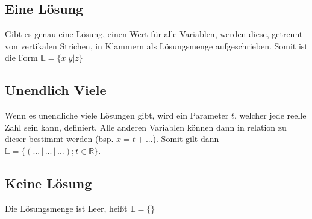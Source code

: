 \documentclass{article}
\begin{document}
\subsection{Eine Lösung}
Gibt es genau eine Lösung, einen Wert für alle Variablen, werden diese, getrennt von vertikalen Strichen, in Klammern als Lösungsmenge aufgeschrieben. Somit ist die Form $\mathbb{L} = \{x \vert y \vert z\}$
 
\subsection{Unendlich Viele}  
Wenn es unendliche viele Lösungen gibt, wird ein Parameter $t$, welcher jede reelle Zahl sein kann, definiert. Alle anderen Variablen können dann in relation zu dieser bestimmt werden (bsp. $x = t + ...$).
Somit gilt dann $\mathbb{L} = \{(... \,\vert\, ... \,\vert\, ...); t \in \mathbb{R}\}$.
 
\subsection{Keine Lösung}
Die Lösungsmenge ist Leer, heißt $\mathbb{L} = \{\}$ 
 
\end{document}

